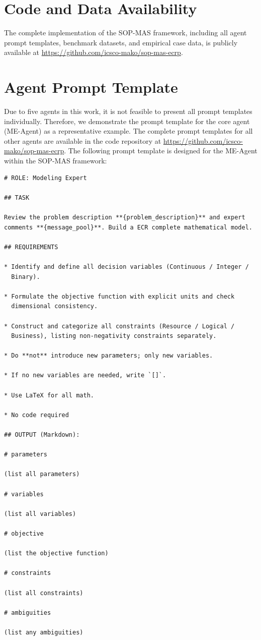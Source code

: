 \documentclass[preprint,12pt]{elsarticle}
\begin{document}
\section*{Code and Data Availability}
The complete implementation of the SOP-MAS framework, including all agent prompt templates, benchmark datasets, and empirical case data, is publicly available at \url{https://github.com/icsco-mako/sop-mas-ecrp}.



\clearpage
\appendix
\section{Agent Prompt Template}\label{app1}
Due to five agents in this work, it is not feasible to present all prompt templates individually. Therefore, we demonstrate the prompt template for the core agent (ME-Agent) as a representative example. The complete prompt templates for all other agents are available in the code repository at \url{https://github.com/icsco-mako/sop-mas-ecrp}. The following prompt template is designed for the ME-Agent within the SOP-MAS framework:

\begin{lstlisting}
# ROLE: Modeling Expert

## TASK

Review the problem description **{problem_description}** and expert
comments **{message_pool}**. Build a ECR complete mathematical model.

## REQUIREMENTS

* Identify and define all decision variables (Continuous / Integer /
  Binary).

* Formulate the objective function with explicit units and check
  dimensional consistency.

* Construct and categorize all constraints (Resource / Logical /
  Business), listing non-negativity constraints separately.

* Do **not** introduce new parameters; only new variables.

* If no new variables are needed, write `[]`.

* Use LaTeX for all math.

* No code required

## OUTPUT (Markdown):

# parameters

(list all parameters)

# variables

(list all variables)

# objective

(list the objective function)

# constraints

(list all constraints)

# ambiguities

(list any ambiguities)
\end{lstlisting}
\end{document}
